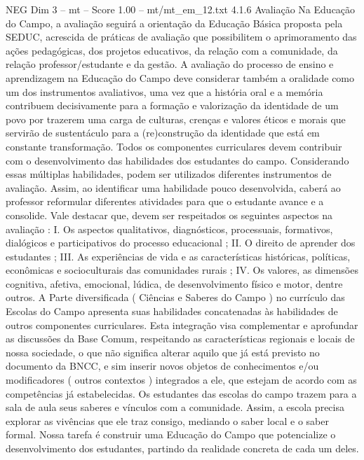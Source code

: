 \begin{textsample}{NEG Dim 3 – mt – Score 1.00 – mt/mt\_em\_12.txt}  \label{ex:f3_neg_216}
4.1.6 Avaliação Na Educação do Campo, a avaliação seguirá a orientação da Educação Básica proposta pela SEDUC, acrescida de práticas de avaliação que possibilitem o aprimoramento das ações pedagógicas, dos projetos educativos, da relação com a comunidade, da relação professor/estudante e da gestão.
A avaliação do processo de ensino e aprendizagem na Educação do Campo deve considerar também a oralidade como um dos instrumentos avaliativos, uma vez que a história oral e a memória contribuem decisivamente para a formação e valorização da identidade de um povo por trazerem uma carga de culturas, crenças e valores éticos e morais que servirão de sustentáculo para a (re)construção da identidade que está em constante transformação.
Todos os componentes curriculares devem contribuir com o desenvolvimento das habilidades dos estudantes do campo.
Considerando essas múltiplas habilidades, podem ser utilizados diferentes instrumentos de avaliação.
Assim, ao identificar uma habilidade pouco desenvolvida, caberá ao professor reformular diferentes atividades para que o estudante avance e a consolide.
Vale destacar que, devem ser respeitados os seguintes aspectos na avaliação : I.
Os aspectos qualitativos, diagnósticos, processuais, formativos, dialógicos e participativos do processo educacional ; II.
O direito de aprender dos estudantes ; III.
As experiências de vida e as características históricas, políticas, econômicas e socioculturais das comunidades rurais ; IV.
Os valores, as dimensões cognitiva, afetiva, emocional, lúdica, de desenvolvimento físico e motor, dentre outros.
A Parte diversificada ( Ciências e Saberes do Campo ) no currículo das Escolas do Campo apresenta suas habilidades concatenadas às habilidades de outros componentes curriculares.
Esta integração visa complementar e aprofundar as discussões da Base Comum, respeitando as características regionais e locais de nossa sociedade, o que não significa alterar aquilo que já está previsto no documento da BNCC, e sim inserir novos objetos de conhecimentos e/ou modificadores ( outros contextos ) integrados a ele, que estejam de acordo com as competências já estabelecidas.
Os estudantes das escolas do campo trazem para a sala de aula seus saberes e vínculos com a comunidade.
Assim, a escola precisa explorar as vivências que ele traz consigo, mediando o saber local e o saber formal.
Nossa tarefa é construir uma Educação do Campo que potencialize o desenvolvimento dos estudantes, partindo da realidade concreta de cada um deles.

\end{textsample}
